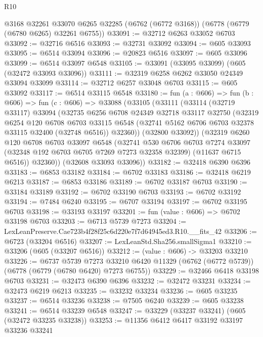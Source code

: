 \begin{lexlean}{R10}
\begin{coremodule}
    @3168
    @32261
    @33070
    @6265
    @32285
    (@6762 (@6772 @3168))
    (@6778 (@6779 (@6780 @6265) @32261 @6755))
@33091 := @32712 @6263 @33052 @6703
@33092 := @32716 @6516
@33093 := @32731 @33092
@33094 := @605 @33093
@33095 := @6514 @33094
@33096 := @20823 @6516
@33097 := @605 @33096
@33099 := @6514 @33097 @6548
@33105 := @33091 (@33095 @33099) (@605 (@32472 @33093 @33096))
@33111 := @32319 @6258 @6262 @33050 @24349 @33094 @33099
@33114 := @32712 @6257 @33048 @6703
@33115 := @605 @33092
@33117 := @6514 @33115 @6548
@33180 := fun (a : @606) =>
  fun (b : @606) =>
  fun (c : @606) =>
  @33088
    (@33105
      (@33111
        (@33114
          (@32719 @33117)
          @33094
          (@32735
            @6256
            @6708
            @24349
            @32718
            @33117
            @32750
            (@32319
              @6254
              @120
              @6708
              @6703
              @33115
              @6548
              (@32741 @5162 @6706 @6703 @32378 @33115 @32400 (@32748 @6516))
              @32360))
          (@32800 @33092))
        (@32319
          @6260
          @120
          @6708
          @6703
          @33097
          @6548
          (@32741
            @530
            @6706
            @6703
            @7274
            @33097
            (@32348 @192 @6703 @6705 @7269 @7273 @32358 @32399)
            (@11637 @6715 @6516))
          @32360))
      (@32608 @33093 @33096))
@33182 := @32418 @6390 @6396
@33183 := @6853 @33182
@33184 := @6702 @33183
@33186 := @32418 @6219 @6213
@33187 := @6853 @33186
@33189 := @6702 @33187 @6703
@33190 := @33184 @33189
@33192 := @6702 @33190 @6703
@33193 := @6702 @33192
@33194 := @7484 @6240
@33195 := @6707 @33194
@33197 := @6702 @33195 @6703
@33198 := @33193 @33197
@33201 := fun (value : @606) => @6702 @33198 @6703
@33203 := @6713 @5739 @7273
@33204 := LexLeanPreserve.Cae723b4f28f25c6d220e7f7d64945ed3.R10.__fits_42
@33206 := @6723 (@33204 @6516)
@33207 := LexLeanStd.Sha256.smallSigma1
@33210 := @33206 (@605 (@33207 @6516))
@33212 := (value : @606) -> @33203 @33210
@33226 := @6737
    @5739
    @7273
    @33210
    @6420
    @11329
    (@6762 (@6772 @5739))
    (@6778 (@6779 (@6780 @6420) @7273 @6755))
@33229 := @32466 @6418 @33198 @6703
@33231 := @32473 @6390 @6396
@33232 := @32472 @33231
@33234 := @32473 @6219 @6213
@33235 := @33232 @33234
@33236 := @605 @33235
@33237 := @6514 @33236
@33238 := @7505 @6240
@33239 := @605 @33238
@33241 := @6514 @33239 @6548
@33247 := @33229 (@33237 @33241) (@605 (@32472 @33235 @33238))
@33253 := @11356 @6412 @6417 @33192 @33197 @33236 @33241

\end{coremodule}
\end{lexlean}
